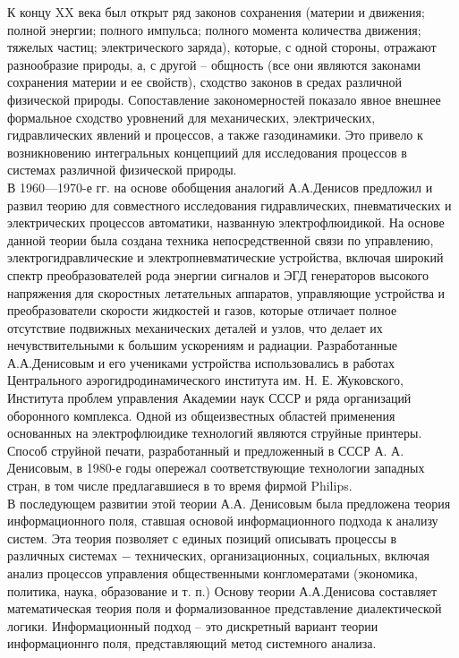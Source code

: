 \documentclass[a4paper,12pt]{report}
\begin{document}
К концу XX века был открыт ряд законов сохранения (материи и движения; полной энергии; полного импульса; полного момента количества движения; тяжелых частиц; электрического заряда), которые, с одной стороны, отражают разнообразие природы, а, с другой – общность (все они являются законами сохранения материи и ее свойств), сходство законов в средах различной физической природы. Сопоставление закономерностей показало явное внешнее формальное сходство уровнений для механических, электрических, гидравлических явлений и процессов, а также газодинамики.  Это привело к возникновению интегральных концепциий для исследования процессов в системах различной физической природы. \\
	В 1960—1970-е гг. на основе обобщения аналогий А.А.Денисов предложил и развил теорию для совместного исследования гидравлических, пневматических и электрических процессов автоматики, названную электрофлюидикой. На основе данной теории была создана техника непосредственной связи по управлению, электрогидравлические и электропневматические устройства, включая широкий спектр преобразователей рода энергии сигналов и ЭГД генераторов высокого напряжения для скоростных летательных аппаратов, управляющие устройства и преобразователи скорости жидкостей и газов, которые отличает полное отсутствие подвижных механических деталей и узлов, что делает их нечувствительными к большим ускорениям и радиации.  Разработанные А.А.Денисовым и его учениками устройства использовались в работах Центрального аэрогидродинамического
института им. Н. Е. Жуковского, Института проблем управления Академии наук СССР и ряда организаций оборонного комплекса. Одной из общеизвестных областей применения основанных на электрофлюидике технологий являются струйные принтеры. Способ струйной печати, разработанный и предложенный в СССР А. А. Денисовым, в 1980-е годы опережал соответствующие технологии западных стран, в том числе предлагавшиеся в то время фирмой Philips.\\
	В последующем развитии этой теории А.А. Денисовым была предложена теория информационного поля, ставшая основой информационного подхода к анализу систем. Эта теория позволяет с единых позиций описывать процессы в различных системах − технических, организационных, социальных, включая анализ процессов управления общественными конгломератами (экономика, политика, наука, образование и т. п.) Основу теории А.А.Денисова составляет математическая теория поля и формализованное представление диалектической логики. Информационный подход – это дискретный вариант теории информационнго поля, представляющий метод системного анализа.\\
\end{document}

